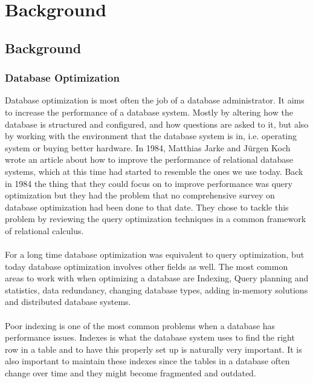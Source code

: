 \documentclass{cslthse-msc}
\begin{document}
\chapter{Background}\label{sec:background}

\section{Background}

\subsection{Database Optimization}
Database optimization is most often the job of a database administrator. It aims to increase the performance of a database system. Mostly by altering how the database is structured and configured, and how questions are asked to it, but also by working with the environment that the database system is in, i.e. operating system or buying better hardware. In 1984, Matthias Jarke and Jürgen Koch \cite{jarke1984query} wrote an article about how to improve the performance of relational database systems, which at this time had started to resemble the ones we use today. Back in 1984 the thing that they could focus on to improve performance was query optimization but they had the problem that no comprehensive survey on database optimization had been done to that date. They chose to tackle this problem by reviewing the query optimization techniques in a common framework of relational calculus.\\\\
For a long time database optimization was equivalent to query optimization, but today database optimization involves other fields as well. The most common areas to work with when optimizing a database are Indexing, Query planning and statistics, data redundancy, changing database types, adding in-memory solutions and distributed database systems.\\\\
Poor indexing is one of the most common problems when a database has performance issues. Indexes is what the database system uses to find the right row in a table and to have this properly set up is naturally very important. It is also important to maintain these indexes since the tables in a database often change over time and they might become fragmented and outdated.\\\\
\end{document}

